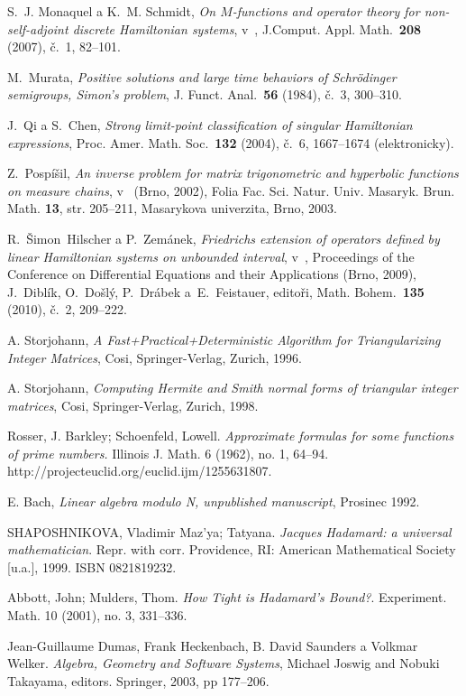\begin{thebibliography}{10}

S.~J. Monaquel a K.~M. Schmidt, \textit{On $M$-functions and operator
  theory for non-self-adjoint discrete Hamiltonian systems}, v~, J.Comput. Appl.
  Math.~\textbf{208} (2007), \v{c}.~1, 82--101.

M.~Murata, \textit{Positive solutions and large time behaviors of
  Schrödinger semigroups, Simon's problem}, J. Funct. Anal.~\textbf{56}
  (1984), č.~3, 300--310.

J.~Qi a S.~Chen, \textit{Strong limit-point classification of singular
  Hamiltonian expressions}, Proc. Amer. Math. Soc.~\textbf{132} (2004),
  č.~6, 1667--1674 (elektronicky).

Z.~Pospíšil, \textit{An inverse problem for matrix trigonometric and
  hyperbolic functions on measure chains}, v~ (Brno, 2002), Folia Fac.
  Sci. Natur. Univ. Masaryk. Brun. Math. {\bf 13}, str. 205--211, Masarykova
  univerzita, Brno, 2003.

R.~Šimon~Hilscher a P.~Zemánek, \textit{Friedrichs extension of
  operators defined by linear Hamiltonian systems on unbounded interval},
  v~, Proceedings of the Conference on Differential Equations and
  their Applications (Brno, 2009), J.~Diblík, O.~Došlý, P.~Drábek
  a~E.~Feistauer, editoři, Math. Bohem.~\textbf{135} (2010),
  č.~2, 209--222.

A. Storjohann, \textit{A Fast+Practical+Deterministic Algorithm for Triangularizing Integer Matrices},
Cosi, Springer-Verlag, Zurich, 1996.

A. Storjohann, \textit{Computing Hermite and Smith normal forms
of triangular integer matrices},
Cosi, Springer-Verlag, Zurich, 1998.

Rosser, J. Barkley; Schoenfeld, Lowell. \textit{Approximate formulas for some functions of prime numbers.} Illinois J. Math. 6 (1962), no. 1, 64--94. http://projecteuclid.org/euclid.ijm/1255631807.

E. Bach, \textit{Linear algebra modulo N, unpublished manuscript},
Prosinec 1992.

SHAPOSHNIKOVA, Vladimir Maz'ya; Tatyana. \textit{Jacques Hadamard: a universal mathematician}.
Repr. with corr. Providence, RI: American Mathematical Society [u.a.], 1999. ISBN 0821819232.

Abbott, John; Mulders, Thom. \textit{How Tight is Hadamard's Bound?}.
Experiment. Math. 10 (2001), no. 3, 331--336.

Jean-Guillaume Dumas, Frank Heckenbach, B. David Saunders a Volkmar Welker.
\textit{Algebra, Geometry and Software Systems}, Michael Joswig and Nobuki Takayama, editors. Springer, 2003, pp 177--206.

\end{thebibliography}

\cleardoublepage
